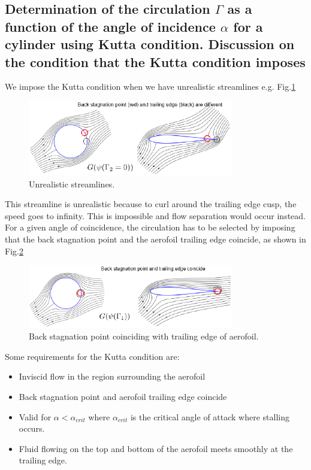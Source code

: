 \documentclass[11pt]{article}
\begin{document}
\subsection*{Determination of the circulation $\Gamma$ as a function of the angle of incidence $\alpha$ for a cylinder using Kutta condition. Discussion on the condition that the Kutta condition imposes}
We impose the Kutta condition when we have unrealistic streamlines e.g. Fig.\ref{unrealisticstreamline}
\begin{figure}[H]
  \centering
  \includegraphics[width = 0.8\textwidth]{./img/diagram18.png}
  \caption{Unrealistic streamlines.}
  \label{unrealisticstreamline}
\end{figure} 
This streamline is unrealistic because to curl around the trailing edge cusp, the speed goes to infinity. This is impossible and flow separation would occur instead. For a given angle of coincidence, the circulation has to be selected by imposing that the back stagnation point and the aerofoil trailing edge coincide, as shown in Fig.\ref{goodkutta}
\begin{figure}[H]
  \centering
  \includegraphics[width = 0.8\textwidth]{./img/diagram19.png}
  \caption{Back stagnation point coinciding with trailing edge of aerofoil.}
  \label{goodkutta}
\end{figure}
Some requirements for the Kutta condition are:
\begin{itemize}
  \item Inviscid flow in the region surrounding the aerofoil
  \item Back stagnation point and aerofoil trailing edge coincide
  \item Valid for $\alpha < \alpha_{crit}$ where $\alpha_{crit}$ is the critical angle of attack where stalling occurs. 
  \item Fluid flowing on the top and bottom of the aerofoil meets smoothly at the trailing edge.
\end{itemize}
\end{document}
